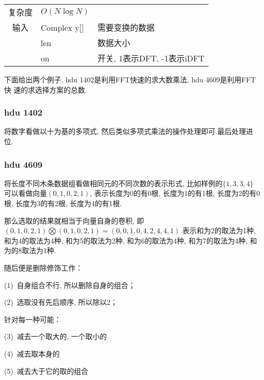 \begin{longtable}{|c|l|l|}
复杂度 & $O(N\log N)$ &  \\
输入 & Complex y[] & 需要变换的数据 \\
 & len & 数据大小 \\
 & on & 开关, 1表示DFT, -1表示iDFT \\
\end{longtable}
下面给出两个例子, hdu 1402是利用FFT快速的求大数乘法, hdu 4609是利用FFT快
速的求选择方案的总数.


        \subsubsection{hdu 1402}\small
将数字看做以十为基的多项式, 然后类似多项式乘法的操作处理即可.最后处理进位.



        \subsubsection{hdu 4609}\small
将长度不同木条数据组看做相同元的不同次数的表示形式, 比如样例的$\{1, 3, 3, 4\}$
可以看做向量$(0, 1, 0, 2, 1)$, 表示长度为0的有0根, 长度为1的有1根, 长度为2的有0根, 
长度为3的有2根, 长度为4的有1根.

那么选取的结果就相当于向量自身的卷积, 即
$(0, 1, 0, 2, 1)\bigotimes (0, 1, 0, 2, 1) = (0, 0, 1, 0, 4, 2, 4, 4, 1)$
表示和为2的取法为1种, 和为4的取法为4种, 和为5的取法为2种, 和为6的取法为4种, 
和为7的取法为4种, 和为的8取法为1种.

随后便是删除修饰工作：

(1)\ 自身组合不行, 所以删除自身的组合；

(2)\ 选取没有先后顺序, 所以除以2；

针对每一种可能：

(3)\ 减去一个取大的, 一个取小的

(4)\ 减去取本身的

(5)\ 减去大于它的取的组合


\endinput
